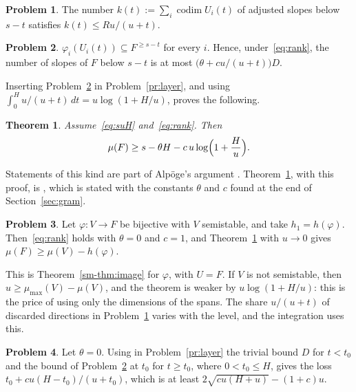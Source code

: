 \documentclass[reqno]{amsart}
\theoremstyle{definition}
\newtheorem{problem}{Problem}[section]
\theoremstyle{plain}
\newtheorem{theorem}{Theorem}[section]
\newcommand{\mumax}{\mu_{\max}}
\newcommand{\codim}{\operatorname{codim}}
\begin{document}
\begin{problem}\label{pr:markov}
The number \(k(t) := \sum_i \codim U_i(t)\) of adjusted slopes below \(s - t\) satisfies \(k(t) \le Ru/(u + t)\).
\end{problem}

\begin{problem}\label{pr:images}
\(\varphi_i(U_i(t)) \subseteq F^{\ge s - t}\) for every \(i\).  Hence, under~\eqref{eq:rank}, the number of slopes of \(F\) below \(s - t\) is at most \(\bigl(\theta + cu/(u+t)\bigr) D\).
\end{problem}

Inserting Problem~\ref{pr:images} in Problem~\ref{pr:layer}, and using \(\int_0^H u/(u+t) \, d t = u\log(1 + H/u)\), proves the following.

\begin{theorem}\label{thm:mean}
Assume~\eqref{eq:suH} and~\eqref{eq:rank}.  Then
\[
  \mu(F) \ge s - \theta H - c\, u \log\Bigl( 1 + \frac{H}{u} \Bigr) .
\]
\end{theorem}

Statements of this kind are part of Alpöge's argument \cite{Alp}.  Theorem~\ref{thm:mean}, with this proof, is \cite[Prop.~4.3]{Zh}, which is stated with the constants \(\theta\) and \(c\) found at the end of Section~\ref{sec:gram}.

\begin{problem}\label{pr:one-map}
Let \(\varphi \colon V \to F\) be bijective with \(V\) semistable, and take \(h_1 = h(\varphi)\).  Then~\eqref{eq:rank} holds with \(\theta = 0\) and \(c = 1\), and Theorem~\ref{thm:mean} with \(u \to 0\) gives \(\mu(F) \ge \mu(V) - h(\varphi)\).
\end{problem}

This is Theorem~\ref{sm-thm:image} for \(\varphi\), with \(U = F\).  If \(V\) is not semistable, then \(u \ge \mumax(V) - \mu(V)\), and the theorem is weaker by \(u\log(1 + H/u)\): this is the price of using only the dimensions of the spans.  The share \(u/(u+t)\) of discarded directions in Problem~\ref{pr:markov} varies with the level, and the integration uses this.

\begin{problem}\label{pr:threshold}
Let \(\theta = 0\).  Using in Problem~\ref{pr:layer} the trivial bound \(D\) for \(t < t_0\) and the bound of Problem~\ref{pr:images} at \(t_0\) for \(t \ge t_0\), where \(0 < t_0 \le H\), gives the loss \(t_0 + cu(H - t_0)/(u + t_0)\), which is at least \(2\sqrt{cu(H + u)} - (1+c)u\).
\end{problem}
\end{document}
